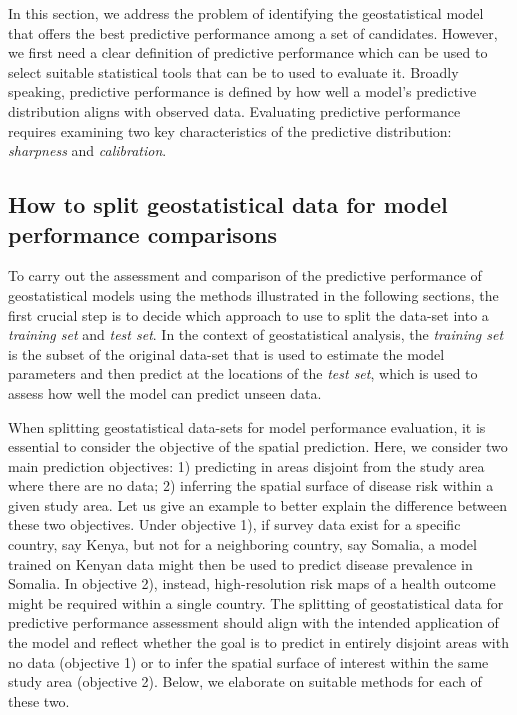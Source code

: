 \documentclass[
  letterpaper,
]{krantz}
\begin{document}
In this section, we address the problem of identifying the
geostatistical model that offers the best predictive performance among a
set of candidates. However, we first need a clear definition of
predictive performance which can be used to select suitable statistical
tools that can be to used to evaluate it. Broadly speaking, predictive
performance is defined by how well a model's predictive distribution
aligns with observed data. Evaluating predictive performance requires
examining two key characteristics of the predictive distribution:
\emph{sharpness} and \emph{calibration}.

\subsection{How to split geostatistical data for model performance
comparisons}\label{sec-split-data}

To carry out the assessment and comparison of the predictive performance
of geostatistical models using the methods illustrated in the following
sections, the first crucial step is to decide which approach to use to
split the data-set into a \emph{training set} and \emph{test set}. In
the context of geostatistical analysis, the \emph{training set} is the
subset of the original data-set that is used to estimate the model
parameters and then predict at the locations of the \emph{test set},
which is used to assess how well the model can predict unseen data.

When splitting geostatistical data-sets for model performance
evaluation, it is essential to consider the objective of the spatial
prediction. Here, we consider two main prediction objectives: 1)
predicting in areas disjoint from the study area where there are no
data; 2) inferring the spatial surface of disease risk within a given
study area. Let us give an example to better explain the difference
between these two objectives. Under objective 1), if survey data exist
for a specific country, say Kenya, but not for a neighboring country,
say Somalia, a model trained on Kenyan data might then be used to
predict disease prevalence in Somalia. In objective 2), instead,
high-resolution risk maps of a health outcome might be required within a
single country. The splitting of geostatistical data for predictive
performance assessment should align with the intended application of the
model and reflect whether the goal is to predict in entirely disjoint
areas with no data (objective 1) or to infer the spatial surface of
interest within the same study area (objective 2). Below, we elaborate
on suitable methods for each of these two.
\end{document}
